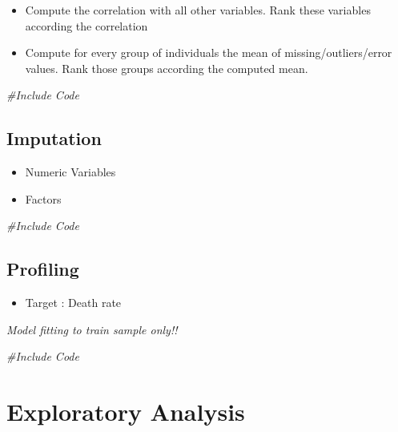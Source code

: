 \documentclass[
]{article}
\newenvironment{Shaded}{\begin{snugshade}}{\end{snugshade}}
\newcommand{\CommentTok}[1]{\textcolor[rgb]{0.56,0.35,0.01}{\textit{#1}}}
\providecommand{\tightlist}{%
  \setlength{\itemsep}{0pt}\setlength{\parskip}{0pt}}
\begin{document}
\begin{itemize}
\tightlist
\item
  Compute the correlation with all other variables. Rank these variables
  according the correlation
\item
  Compute for every group of individuals the mean of
  missing/outliers/error values. Rank those groups according the
  computed mean.
\end{itemize}

\begin{Shaded}
\begin{Highlighting}[]
\CommentTok{\#Include Code}
\end{Highlighting}
\end{Shaded}

\subsection{Imputation}\label{imputation}

\begin{itemize}
\tightlist
\item
  Numeric Variables
\item
  Factors
\end{itemize}

\begin{Shaded}
\begin{Highlighting}[]
\CommentTok{\#Include Code}
\end{Highlighting}
\end{Shaded}

\subsection{Profiling}\label{profiling}

\begin{itemize}
\tightlist
\item
  Target : Death rate
\end{itemize}

\emph{Model fitting to train sample only!!}

\begin{Shaded}
\begin{Highlighting}[]
\CommentTok{\#Include Code}
\end{Highlighting}
\end{Shaded}

\section{Exploratory Analysis}\label{exploratory-analysis}

\section{}\label{section}
\end{document}
